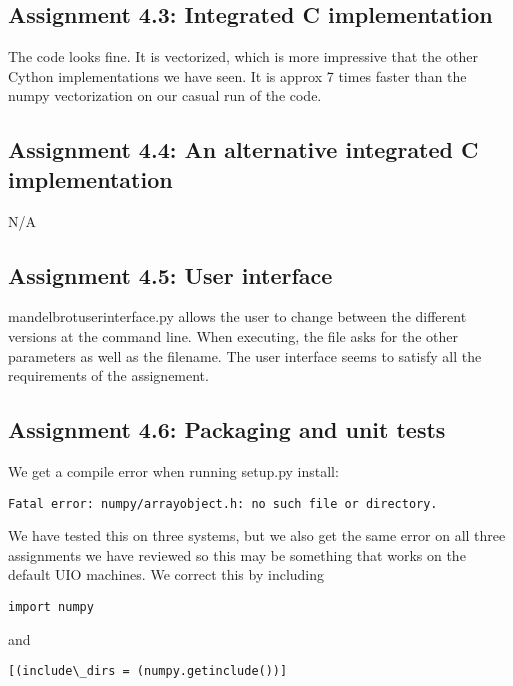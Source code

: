 \documentclass[a4paper]{article}
\begin{document}
\subsection*{Assignment 4.3: Integrated C implementation}

The code looks fine.\newline
It is vectorized, which is more impressive that the other Cython implementations we have seen. It is approx 7 times faster than the numpy vectorization on our casual run of the code.


\subsection*{Assignment 4.4:  An alternative integrated C implementation}

N/A

\subsection*{Assignment 4.5: User interface}

mandelbrotuserinterface.py allows the user to change between the different versions at the command line. When executing, the file asks for the other parameters as well as the filename.\newline
The user interface seems to satisfy all the requirements of the assignement.

\subsection*{Assignment 4.6:  Packaging and unit tests}

We get a compile error when running setup.py install:  \newline
\begin{verbatim} 
Fatal error: numpy/arrayobject.h: no such file or directory. 
\end{verbatim}
\newline
We have tested this on three systems, but we also get the same error on all three assignments we have reviewed so this may be something that works on the default UIO machines.
We correct this by including  \newline
\begin{verbatim} 
import numpy 
\end{verbatim}
\newline
and \newline
\begin{verbatim} 
[(include\_dirs = (numpy.getinclude())] 
\end{verbatim}
\newline
\end{document}
